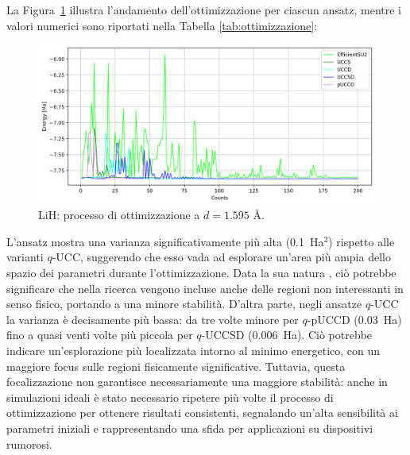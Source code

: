 La Figura~\ref{fig:LiH-UCC-ottimizzazione} illustra l’andamento dell’ottimizzazione per ciascun ansatz, mentre i valori numerici sono riportati nella Tabella \ref{tab:ottimizzazione}:

\begin{figure}[H]
    \centering
    \hspace{-0.9cm}
    \includegraphics[width=.8\linewidth]{Immagini/Capitolo_3/ottimizzazione.png}
    \caption{LiH: processo di ottimizzazione a $d=1.595$ \AA.}
    \label{fig:LiH-UCC-ottimizzazione}
\end{figure}



L'ansatz  mostra una varianza significativamente più alta (0.1~Ha$^2$) rispetto alle varianti $q$-UCC, suggerendo che esso vada ad esplorare un’area più ampia dello spazio dei parametri durante l’ottimizzazione. Data la sua natura , ciò potrebbe significare che nella ricerca vengono incluse anche delle regioni non interessanti in senso fisico, portando a una minore stabilità. D'altra parte, negli ansatze $q$-UCC la varianza è decisamente più bassa: da tre volte minore per $q$-pUCCD ($0.03$~Ha) fino a quasi venti volte più piccola per $q$-UCCSD ($0.006$~Ha). Ciò potrebbe indicare un’esplorazione più localizzata intorno al minimo energetico, con un maggiore focus sulle regioni fisicamente significative. Tuttavia, questa focalizzazione non garantisce necessariamente una maggiore stabilità: anche in simulazioni ideali è stato necessario ripetere più volte il processo di ottimizzazione per ottenere risultati consistenti, segnalando un'alta sensibilità ai parametri iniziali e rappresentando una sfida per applicazioni su dispositivi rumorosi.


